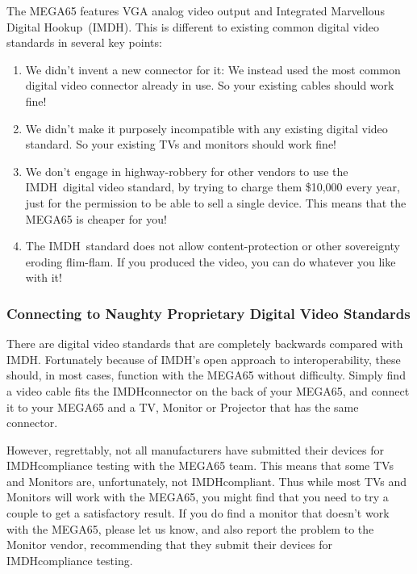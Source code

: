 The MEGA65 features VGA analog video output and Integrated Marvellous
Digital Hookup\texttrademark \ (IMDH\texttrademark ). This is different
to existing common digital video standards in several key points:

\begin{enumerate}
  \item We didn't invent a new connector for it: We instead used the
    most common digital video connector already in use.  So your
    existing cables should work fine!
  \item We didn't make it purposely incompatible with any existing
    digital video standard. So your existing TVs and monitors should
    work fine!
  \item We don't engage in highway-robbery for other vendors to use
    the IMDH\texttrademark \ digital video standard, by trying to
    charge them \$10,000 every year, just for the permission to be
    able to sell a single device. This means that the MEGA65 is
    cheaper for you!
  \item The IMDH\texttrademark \ standard does not allow
    content-protection or other sovereignty eroding flim-flam. If you
    produced the video, you can do whatever you like with it!
\end{enumerate}

\subsubsection{Connecting to Naughty Proprietary Digital Video
  Standards}

There are digital video standards that are completely backwards compared
with IMDH\texttrademark. Fortunately because of IMDH\texttrademark's
open approach to interoperability, these should, in most cases,
function with the MEGA65 without difficulty.  Simply find a video
cable fits the IMDH\texttrademark connector on the back of your MEGA65, and connect
it to your MEGA65 and a TV, Monitor or Projector that has the same
connector.

However, regrettably, not all manufacturers
have submitted their devices for IMDH\texttrademark compliance testing with the
MEGA65 team. This means that some TVs and Monitors are,
unfortunately, not IMDH\texttrademark compliant.  Thus while most TVs and Monitors
will work with the MEGA65, you might find that you need to try a
couple to get a satisfactory result.  If you do find a monitor that
doesn't work with the MEGA65, please let us know, and also report the
problem to the Monitor vendor, recommending that they submit their
devices for IMDH\texttrademark compliance testing.

